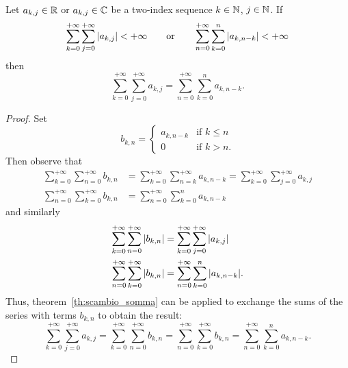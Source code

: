 \begin{theorem}
  \label{th:somma_Cauchy}%
Let $a_{k,j}\in {\mathbb R}$ or $a_{k,j}\in {\mathbb C}$ be a two-index sequence $k\in {\mathbb N}$,
$j\in{\mathbb N}$. If
\[
  \sum_{k=0}^{+\infty} \sum_{j=0}^{+\infty} {\left|a_{k,j}\right|} < +\infty
  \qquad\text{or}\qquad 
  \sum_{n=0}^{+\infty} \sum_{k=0}^n {\left|a_{k,n-k}\right|} < +\infty
\]  
then 
\begin{equation}\label{eq:somma_Cauchy}
  \sum_{k=0}^{+\infty} \sum_{j=0}^{+\infty} a_{k,j}
   = \sum_{n=0}^{+\infty} \sum_{k=0}^{n} a_{k,n-k}.
\end{equation}
\end{theorem}
%
\begin{proof}
Set 
\[
  b_{k,n} = \begin{cases}
    a_{k,n-k} & \text{if $k\le n$}\\
    0 & \text{if $k>n$}.
  \end{cases}  
\]
Then observe that 
\begin{align*}
  \sum_{k=0}^{+\infty} \sum_{n=0}^{+\infty} b_{k,n}
  &= \sum_{k=0}^{+\infty} \sum_{n=k}^{+\infty} a_{k,n-k} 
  = \sum_{k=0}^{+\infty} \sum_{j=0}^{+\infty} a_{k,j}
  \\
  \sum_{n=0}^{+\infty}\sum_{k=0}^{+\infty} b_{k,n} 
  &= \sum_{n=0}^{+\infty}\sum_{k=0}^{n} a_{k,n-k}
\end{align*}
and similarly
\begin{align*}
  \sum_{k=0}^{+\infty} \sum_{n=0}^{+\infty} {\left|b_{k,n}\right|}
  &= \sum_{k=0}^{+\infty} \sum_{j=0}^{+\infty} {\left|a_{k,j}\right|}
  \\
  \sum_{n=0}^{+\infty} \sum_{k=0}^{+\infty} {\left|b_{k,n}\right|}
  &= \sum_{n=0}^{+\infty} \sum_{k=0}^{n} {\left|a_{k,n-k}\right|}.  
\end{align*}
Thus, theorem~\ref{th:scambio_somma} can be applied to exchange the sums of the
series with terms $b_{k,n}$ to obtain the result:
\[
  \sum_{k=0}^{+\infty} \sum_{j=0}^{+\infty} a_{k,j}
  = \sum_{k=0}^{+\infty}\sum_{n=0}^{+\infty} b_{k,n} 
  = \sum_{n=0}^{+\infty} \sum_{k=0}^{+\infty} b_{k,n}
  = \sum_{n=0}^{+\infty} \sum_{k=0}^{n} a_{k,n-k}.
\]
\end{proof}